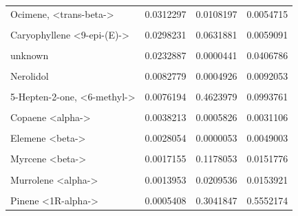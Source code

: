 \documentclass[12pt,final,CPage]{ufthesis}
\begin{document}
{\begin{longtable}[t]{lrrr}
  Ocimene, <trans-beta-> & 0.0312297 & 0.0108197 & 0.0054715\\
  \addlinespace
  \cellcolor{gray!6}{2-Hexenal} & \cellcolor{gray!6}{0.0304577} & \cellcolor{gray!6}{0.0046560} & \cellcolor{gray!6}{0.0224511}\\
  Caryophyllene <9-epi-(E)-> & 0.0298231 & 0.0631881 & 0.0059091\\
  \cellcolor{gray!6}{2,4,6-Octatriene, 2,6-dimethyl-, (E,Z)-} & \cellcolor{gray!6}{0.0233474} & \cellcolor{gray!6}{0.0270255} & \cellcolor{gray!6}{0.0009908}\\
  unknown & 0.0232887 & 0.0000441 & 0.0406786\\
  \cellcolor{gray!6}{Camphor} & \cellcolor{gray!6}{0.0107637} & \cellcolor{gray!6}{0.0000204} & \cellcolor{gray!6}{0.0188011}\\
  \addlinespace
  Nerolidol & 0.0082779 & 0.0004926 & 0.0092053\\
  \cellcolor{gray!6}{Farnesene <(E)-, beta->} & \cellcolor{gray!6}{0.0079276} & \cellcolor{gray!6}{0.0000150} & \cellcolor{gray!6}{0.0138472}\\
  5-Hepten-2-one, <6-methyl-> & 0.0076194 & 0.4623979 & 0.0993761\\
  \cellcolor{gray!6}{Trivertal} & \cellcolor{gray!6}{0.0060998} & \cellcolor{gray!6}{0.3219597} & \cellcolor{gray!6}{0.0388516}\\
  Copaene <alpha-> & 0.0038213 & 0.0005826 & 0.0031106\\
  \addlinespace
  \cellcolor{gray!6}{Mesitylene} & \cellcolor{gray!6}{0.0036797} & \cellcolor{gray!6}{0.0431734} & \cellcolor{gray!6}{0.0303253}\\
  Elemene <beta-> & 0.0028054 & 0.0000053 & 0.0049003\\
  \cellcolor{gray!6}{Benzaldehyde <para-ethyl->} & \cellcolor{gray!6}{0.0021270} & \cellcolor{gray!6}{0.0000040} & \cellcolor{gray!6}{0.0037366}\\
  Myrcene <beta-> & 0.0017155 & 0.1178053 & 0.0151776\\
  \cellcolor{gray!6}{2-Thujene} & \cellcolor{gray!6}{0.0016199} & \cellcolor{gray!6}{0.0705489} & \cellcolor{gray!6}{0.0080563}\\
  \addlinespace
  Murrolene <alpha-> & 0.0013953 & 0.0209536 & 0.0153921\\
  \cellcolor{gray!6}{2-Hexen-1-ol, acetate, (E)-} & \cellcolor{gray!6}{0.0009637} & \cellcolor{gray!6}{0.0778123} & \cellcolor{gray!6}{0.0032888}\\
  Pinene <1R-alpha-> & 0.0005408 & 0.3041847 & 0.5552174\\

\end{longtable}}
\end{document}
